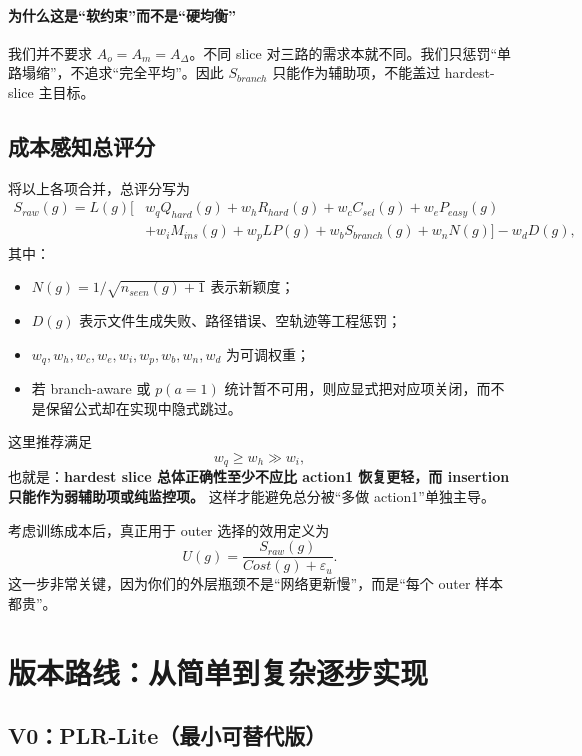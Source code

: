 \documentclass[11pt,a4paper]{ctexart}
\begin{document}
\paragraph{为什么这是“软约束”而不是“硬均衡”}
我们并不要求 \(A_o=A_m=A_\Delta\)。不同 slice 对三路的需求本就不同。我们只惩罚“单路塌缩”，不追求“完全平均”。因此 \(S_{branch}\) 只能作为辅助项，不能盖过 hardest-slice 主目标。

\subsection{成本感知总评分}
将以上各项合并，总评分写为
\begin{equation}
\begin{aligned}
S_{raw}(g)=L(g)\Big[&w_q Q_{hard}(g)+w_h R_{hard}(g)+w_c C_{sel}(g)+w_e P_{easy}(g) \\
&+w_i M_{ins}(g)+w_p LP(g)+w_b S_{branch}(g)+w_n N(g)\Big]-w_d D(g),
\end{aligned}
\label{eq:sraw}
\end{equation}
其中：
\begin{itemize}[leftmargin=2.2em,itemsep=0.15em]
    \item \(N(g)=1/\sqrt{n_{seen}(g)+1}\) 表示新颖度；
    \item \(D(g)\) 表示文件生成失败、路径错误、空轨迹等工程惩罚；
    \item \(w_q,w_h,w_c,w_e,w_i,w_p,w_b,w_n,w_d\) 为可调权重；
    \item 若 branch-aware 或 \(p(a=1)\) 统计暂不可用，则应显式把对应项关闭，而不是保留公式却在实现中隐式跳过。
\end{itemize}
这里推荐满足
\[
w_q \ge w_h \gg w_i,
\]
也就是：\textbf{hardest slice 总体正确性至少不应比 action1 恢复更轻，而 insertion 只能作为弱辅助项或纯监控项。} 这样才能避免总分被“多做 action1”单独主导。

考虑训练成本后，真正用于 outer 选择的效用定义为
\begin{equation}
U(g)=\frac{S_{raw}(g)}{Cost(g)+\varepsilon_u}.
\label{eq:utility}
\end{equation}
这一步非常关键，因为你们的外层瓶颈不是“网络更新慢”，而是“每个 outer 样本都贵”。

\section{版本路线：从简单到复杂逐步实现}

\subsection{V0：PLR-Lite（最小可替代版）}
\end{document}
